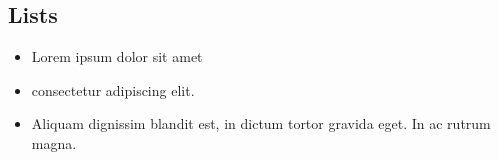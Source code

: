 \documentclass[twocolumn, switch]{article}
\begin{document}
\subsection{Lists}
\begin{itemize}
\item Lorem ipsum dolor sit amet
\item consectetur adipiscing elit.
\item Aliquam dignissim blandit est, in dictum tortor gravida eget. In ac rutrum magna.
\end{itemize}



%


\end{document}
